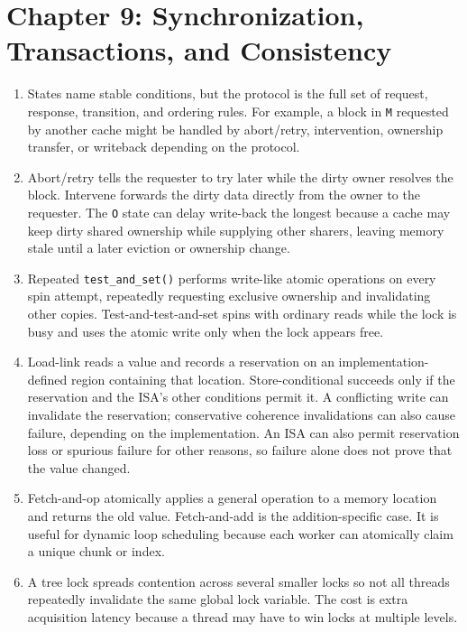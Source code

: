 \documentclass[11pt]{article}
\begin{document}
\section{Chapter 9: Synchronization, Transactions, and Consistency}
\begin{enumerate}
    \item States name stable conditions, but the protocol is the full set of request, response, transition, and ordering rules.
    For example, a block in \texttt{M} requested by another cache might be handled by abort/retry, intervention, ownership transfer, or writeback depending on the protocol.

    \item Abort/retry tells the requester to try later while the dirty owner resolves the block.
    Intervene forwards the dirty data directly from the owner to the requester.
    The \texttt{O} state can delay write-back the longest because a cache may keep dirty shared ownership while supplying other sharers, leaving memory stale until a later eviction or ownership change.

    \item Repeated \texttt{test\_and\_set()} performs write-like atomic operations on every spin attempt, repeatedly requesting exclusive ownership and invalidating other copies.
    Test-and-test-and-set spins with ordinary reads while the lock is busy and uses the atomic write only when the lock appears free.

    \item Load-link reads a value and records a reservation on an implementation-defined region containing that location.
    Store-conditional succeeds only if the reservation and the ISA's other conditions permit it.
    A conflicting write can invalidate the reservation; conservative coherence invalidations can also cause failure, depending on the implementation.
    An ISA can also permit reservation loss or spurious failure for other reasons, so failure alone does not prove that the value changed.

    \item Fetch-and-op atomically applies a general operation to a memory location and returns the old value.
    Fetch-and-add is the addition-specific case.
    It is useful for dynamic loop scheduling because each worker can atomically claim a unique chunk or index.

    \item A tree lock spreads contention across several smaller locks so not all threads repeatedly invalidate the same global lock variable.
    The cost is extra acquisition latency because a thread may have to win locks at multiple levels.


\end{enumerate}
\end{document}
